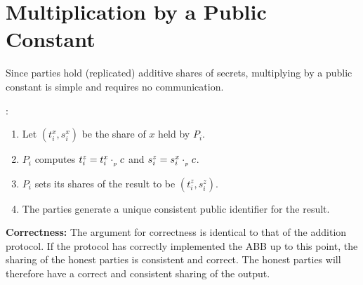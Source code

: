 \section{Multiplication by a Public Constant}

Since parties hold (replicated) additive shares of secrets, multiplying by a public constant is simple and requires no communication.

\begin{protocol}
	:
		\begin{enumerate}
			\item Let $(t^x_i, s^x_i)$ be the share of $x$ held by $P_i$.
			\item $P_i$ computes $t^z_i = t^x_i \cdot_{_p} c$ and $s^z_i = s^x_i \cdot_{_p} c$.
			\item $P_i$ sets its shares of the result to be
				$(t^z_i, s^z_i)$.
			\item The parties generate a unique consistent public identifier for the result.
		\end{enumerate}
\end{protocol}

\textbf{Correctness:}
The argument for correctness is identical to that of the addition protocol.
If the protocol has correctly implemented the ABB up to this point, the sharing of the honest parties is consistent and correct.
The honest parties will therefore have a correct and consistent sharing of the output.